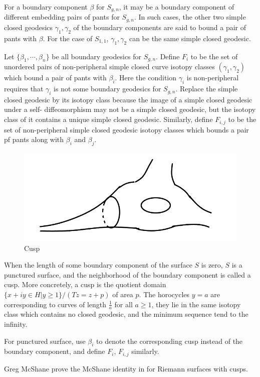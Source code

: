 For a boundary component $\beta$ for $S_{g,n}$, it may be a boundary  component of different embedding pairs of pants for $S_{g,n}$. In such cases, the other two simple closed  geodesics  $\gamma_1,\gamma_2$ of the boundary components  are said to bound a pair of pants with $\beta$. For the case of $S_{1,1}$, $\gamma_1,\gamma_2$ can be the same simple closed geodesic.

Let $\{\beta_1,\cdots,\beta_n\}$ be all boundary geodesics  for $S_{g,n}$.
Define $F_{i}$ to be the set of unordered pairs  of  non-peripheral simple closed curve  isotopy classes $(\gamma_1,\gamma_2)$ which bound a pair of pants with $\beta_i$. Here the condition  $\gamma_i$ is non-peripheral requires that $\gamma_i$ is not some boundary  geodesics for $S_{g,n}$. Replace the simple closed geodesic by its isotopy class because the image of a simple  closed geodesic under a self- diffeomorphism  may not be a simple  closed geodesic,  but the isotopy class of it contains a unique simple closed geodesic. Similarly, define $F_{i,j}$ to be the set of non-peripheral simple closed geodesic  isotopy classes which bounds a pair pf pants along with $\beta_i$ and $\beta_j$.


\begin{figure}[h]
    \centering
    \includegraphics[width=3 in]{picture/cusp.png}
    \caption{Cusp}
    \label{fig:cusp}
\end{figure}


When the length  of some  boundary component  of the surface $S$  is zero, $S$ is a punctured  surface, and the neighborhood of the boundary component  is called a cusp. More concretely, a cusp is   the quotient domain $\{x+iy\in H|y\geq 1\}/(Tz=z+p)$ of area $p$. The horocycles $y=a$ are  corresponding to curves of length $\frac{1}{a}$ for all $a\geq 1$, they lie in the same isotopy class which contains no closed geodesic, and the minimum sequence tend to the infinity. 

For punctured surface, use $\beta_i$ to denote  the corresponding cusp instead of the boundary component, and define $F_i$, $F_{i,j}$ similarly. 




 Greg McShane prove the McShane identity in \cite{McShane1998SimpleGA} for Riemann surfaces with cusps.

